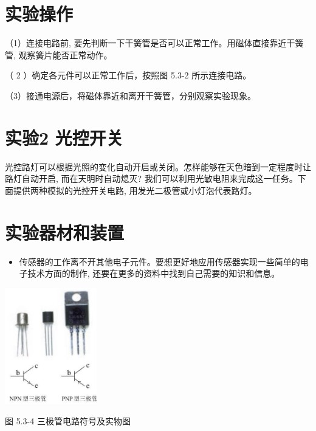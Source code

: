 \documentclass[10pt]{article}
\begin{document}
\section*{实验操作}

（1）连接电路前, 要先判断一下干簧管是否可以正常工作。用磁体直接靠近干簧管, 观察簧片能否正常动作。

（ 2 ）确定各元件可以正常工作后，按照图 5.3-2 所示连接电路。

（3）接通电源后，将磁体靠近和离开干簧管，分别观察实验现象。

\section*{实验2 光控开关}

光控路灯可以根据光照的变化自动开启或关闭。怎样能够在天色暗到一定程度时让路灯自动开启, 而在天明时自动熄灭? 我们可以利用光敏电阻来完成这一任务。下面提供两种模拟的光控开关电路, 用发光二极管或小灯泡代表路灯。

\section*{实验器材和装置}

\begin{mdframed}

\begin{itemize}
\item 传感器的工作离不开其他电子元件。要想更好地应用传感器实现一些简单的电子技术方面的制作, 还要在更多的资料中找到自己需要的知识和信息。
\end{itemize}

\begin{center}
\includegraphics[max width=0.3\textwidth]{images/01910e72-c5b7-7ed5-a6d4-fb3a5faefc32_110_764617.jpg}
\end{center}

图 5.3-4 三极管电路符号及实物图

\end{mdframed}
\end{document}
